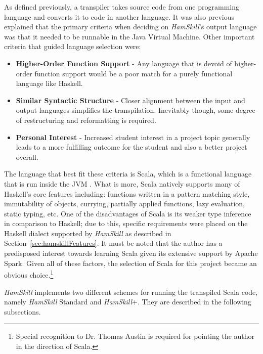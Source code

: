 \documentclass{report}
\begin{document}
As defined previously, a transpiler takes source code from one programming language and converts it to code in another language.  It was also previous explained that the primary criteria when deciding on \textit{HamSkill}'s output language was that it needed to be runnable in the Java Virtual Machine.  Other important criteria that guided language selection were:

\begin{itemize}

	\item \textbf{Higher-Order Function Support} - Any language that is devoid of higher-order function support would be a poor match for a purely functional language like Haskell.
	
	\item \textbf{Similar Syntactic Structure} - Closer alignment between the input and output languages simplifies the transpilation.  Inevitably though, some degree of restructuring and reformatting is required.  
	
	\item \textbf{Personal Interest} - Increased student interest in a project topic generally leads to a more fulfilling outcome for the student and also a better project overall.  

\end{itemize}

The language that best fit these criteria is Scala, which is a functional language that is run inside the JVM \cite{whatIsScala}. What is more, Scala natively supports many of Haskell's core features including: functions written in a pattern matching style, immutability of objects, currying, partially applied functions, lazy evaluation, static typing, etc.  One of the disadvantages of Scala is its weaker type inference in comparison to Haskell; due to this, specific requirements were placed on the Haskell dialect supported by \textit{HamSkill} as described in Section~\ref{sec:hamskillFeatures}.  It must be noted that the author has a predisposed interest towards learning Scala given its extensive support by Apache Spark.  Given all of these factors, the selection of Scala for this project became an obvious choice.\footnote{Special recognition to Dr. Thomas Austin is required for pointing the author in the direction of Scala.}

\textit{HamSkill} implements two different schemes for running the transpiled Scala code, namely \textit{HamSkill} Standard and \textit{HamSkill}+.  They are described in the following subsections.
\end{document}
